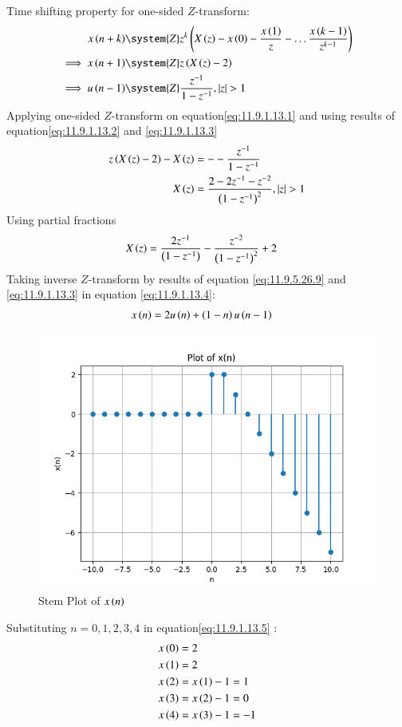 \documentclass[journal,12pt,twocolumn]{IEEEtran}
\theoremstyle{remark}
\begin{document}
Time shifting property for one-sided $Z$-transform:
\begin{align}
x\brak{n+k}&\system{Z} z^{k}\brak{X\brak{z}-x\brak{0}-\frac{x\brak{1}}{z}-\ldots \frac{x\brak{k-1}}{z^{k-1}}}\label{eq:one-sided-shiftk}\\
\implies x\brak{n+1} &\system{Z} z\brak{X\brak{z}-2}\label{eq:11.9.1.13.2}\\
\implies u\brak{n-1} &\system{Z} \frac{z^{-1}}{1-z^{-1}},\abs{z}>1 \label{eq:11.9.1.13.3}
\end{align}
Applying one-sided $Z$-transform on equation\eqref{eq:11.9.1.13.1} and using results of equation\eqref{eq:11.9.1.13.2} and \eqref{eq:11.9.1.13.3}
\begin{align}
 z\left(X\left(z\right)-2\right) - X\left(z\right) &= --\frac{z^{-1}}{1-z^{-1}}\\
    X\left(z\right) &= \frac{2-2z^{-1}-z^{-2}}{\left(1-z^{-1}\right)^2}  ,   \left\vert z\right\vert >1
\end{align}
Using partial fractions
\begin{align}
    X\left(z\right) &= \frac{2z^{-1}}{\left(1-z^{-1}\right)} - \frac{z^{-2}}{\left(1-z^{-1}\right)^2} + 2\label{eq:11.9.1.13.4}
\end{align}
Taking inverse $Z$-transform by results of equation \eqref{eq:11.9.5.26.9} and \eqref{eq:11.9.1.13.3} in equation \eqref{eq:11.9.1.13.4}:
\begin{align}
    x\left(n\right) &= 2u\left(n\right)+\left(1-n\right)u\left(n-1\right)\label{eq:11.9.1.13.5}
\end{align}
\begin{figure}[H]
    \centering
    \includegraphics[width=1\columnwidth]{figs/fig_x(n).png}
    \caption{Stem Plot of $x\left(n\right)$}
    \label{fig:x(n)}
\end{figure}
Substituting $n=0,1,2,3,4$ in equation\eqref{eq:11.9.1.13.5} :
\begin{align}
    x\left(0\right) &= 2\\
    x\left(1\right) &= 2\\
    x\left(2\right) &= x\left(1\right) - 1 = 1  \\
    x\left(3\right) &= x\left(2\right) - 1 = 0\\
    x\left(4\right) &= x\left(3\right) - 1 = -1 
\end{align}
\end{document}

